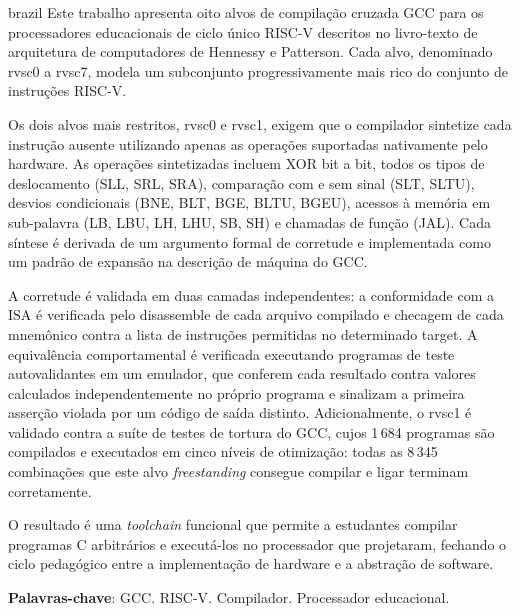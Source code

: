 \documentclass[
	12pt,				%
	openright,			%
	twoside,			%
	a4paper,			%
	english,			%
	french,				%
	spanish,			%
	brazil				%
	]{abntex2}
\begin{document}
\begin{resumo}[Resumo]
 \begin{otherlanguage*}{brazil}
Este trabalho apresenta oito alvos de compilação cruzada GCC para os processadores educacionais de
ciclo único RISC-V descritos no livro-texto de arquitetura de computadores de Hennessy e Patterson.
Cada alvo, denominado rvsc0 a rvsc7, modela um subconjunto progressivamente mais rico do conjunto
de instruções RISC-V.

Os dois alvos mais restritos, rvsc0 e rvsc1, exigem que o compilador sintetize cada instrução
ausente utilizando apenas as operações suportadas nativamente pelo hardware. As operações sintetizadas
incluem XOR bit a bit, todos os tipos de deslocamento (SLL, SRL, SRA), comparação com e sem sinal
(SLT, SLTU), desvios condicionais (BNE, BLT, BGE, BLTU, BGEU), acessos à memória em sub-palavra
(LB, LBU, LH, LHU, SB, SH) e chamadas de função (JAL). Cada síntese é derivada de um argumento
formal de corretude e implementada como um padrão de expansão na descrição de máquina do GCC.

A corretude é validada em duas camadas independentes: a conformidade com a ISA é verificada pelo
disassemble de cada arquivo compilado e
checagem de cada mnemônico contra a lista de instruções permitidas no determinado target.
A equivalência comportamental é
verificada executando programas de teste autovalidantes em um emulador, que conferem cada resultado contra
valores calculados independentemente no próprio programa e sinalizam a primeira asserção violada por
um código de saída distinto. Adicionalmente, o rvsc1 é validado contra a suíte de testes de tortura
do GCC, cujos 1\,684 programas são compilados e executados em cinco níveis de otimização: todas as
8\,345 combinações que este alvo \textit{freestanding} consegue compilar e ligar terminam
corretamente.

O resultado é uma \textit{toolchain} funcional que permite a estudantes compilar programas C
arbitrários e executá-los no processador que projetaram, fechando o ciclo pedagógico entre a
implementação de hardware e a abstração de software.


   \vspace{\onelineskip}

   \noindent
   \textbf{Palavras-chave}: GCC. RISC-V. Compilador. Processador educacional.
 \end{otherlanguage*}
\end{resumo}
\end{document}
